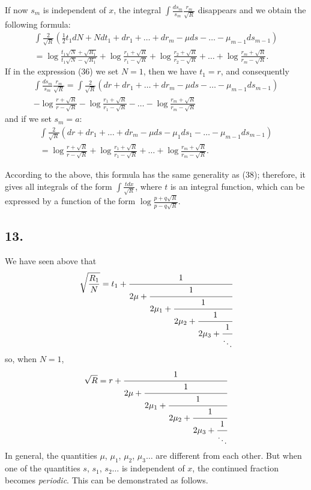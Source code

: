 \documentclass[oneside, 12 pt, leqno]{memoir}
\begin{document}
If now \(s_m\) is independent of \(x\), the integral \(\int \frac{d s_m}{s_m} \frac{r_m}{\sqrt{R}}\) disappears and we obtain the following formula:
\[\tag{38} \begin{gathered}
 \int \frac{2}{\sqrt{R}}\left(\frac{1}{2} t_1 d N+N d t_1+d r_1+\dots+d r_m-\mu d s-\dots-\mu_{m-1} d s_{m-1}\right) \\
=  \log \frac{t_1 \sqrt{N}+\sqrt{R_1}}{t_1 \sqrt{N}-\sqrt{R_1}}+\log \frac{r_1+\sqrt{R}}{r_1-\sqrt{R}}+\log \frac{r_2+\sqrt{R}}{r_2-\sqrt{R}}+\dots+\log \frac{r_m+\sqrt{R}}{r_m-\sqrt{R}}.
\end{gathered}\]
If in the expression (36) we set \(N=1\), then we have \(t_1=r\), and consequently
\[\tag{39}\begin{aligned}
\int \frac{d s_m}{s_m} \frac{r_m}{\sqrt{R}} = \int \frac{2}{\sqrt{R}}\left(d r+d r_1+\dots+d r_m-\mu d s-\dots-\mu_{m-1} d s_{m-1}\right) \\
-\log \frac{r+\sqrt{R}}{r-\sqrt{R}}-\log \frac{r_1+\sqrt{R}}{r_1-\sqrt{R}}-\dots-\log \frac{r_m+\sqrt{R}}{r_m-\sqrt{R}}
\end{aligned}\]
and if we set \(s_m=a\):
\[\tag{40}\begin{gathered}
\int \frac{2}{\sqrt{{R}}}\left(d r+d r_1+\dots+d r_m-\mu d s-\mu_1 d s_1-\dots-\mu_{m-1} d s_{m-1}\right) \\
=\log \frac{r+\sqrt{R}}{r-\sqrt{R}}+\log \frac{r_1+\sqrt{R}}{r_1-\sqrt{R}}+\dots+\log \frac{r_m+\sqrt{R}}{r_m-\sqrt{R}}.
\end{gathered}\]

According to the above, this formula has the same generality as (38); therefore, it gives all integrals of the form \(\int \frac{t d x}{\sqrt{R}}\), where \(t\) is an integral function, which can be expressed by a function of the form \(\log \frac{p+q \sqrt{R}}{p-q \sqrt{R}}\).

\subsection*{13.}

We have seen above that
\[\sqrt{\frac{R_1}{N}}=t_1+\cfrac{1}{2 \mu+\cfrac{1}{2 \mu_1+\cfrac{1}{2 \mu_2+\cfrac{1}{2 \mu_3+\cfrac{1}{\ddots}}}}}\]
so, when \(N=1\),
\[\sqrt{R}=r+\cfrac{1}{2 \mu+\cfrac{1}{2 \mu_1+\cfrac{1}{2 \mu_2+\cfrac{1}{2 \mu_3+\cfrac{1}{\ddots}}}}}\]
In general, the quantities \(\mu\), \(\mu_1\), \(\mu_2\), \(\mu_3 \dots\) are different from each other. But when one of the quantities \(s\), \(s_1\), \(s_2 \dots\) is independent of \(x\), the continued fraction becomes \textit{periodic}. This can be demonstrated as follows.
\end{document}
